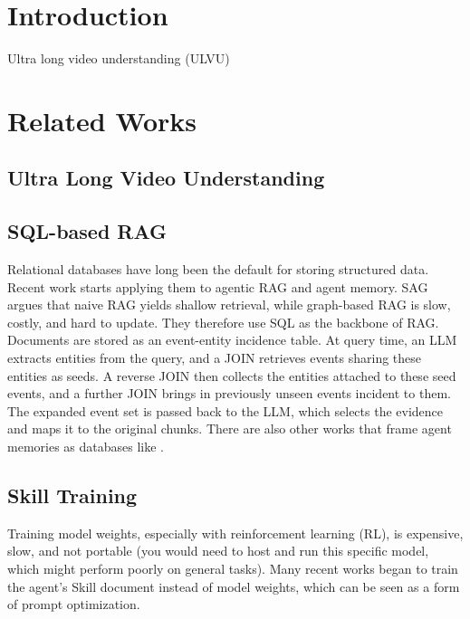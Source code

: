 \section{Introduction}
\label{sec:intro}
Ultra long video understanding (ULVU)

\section{Related Works}
\subsection{Ultra Long Video Understanding}

\subsection{SQL-based RAG}
Relational databases have long been the default for storing structured data. Recent work starts applying them to agentic RAG and agent memory. SAG \cite{wu_sag_2026} argues that naive RAG yields shallow retrieval, while graph-based RAG is slow, costly, and hard to update. They therefore use SQL as the backbone of RAG. Documents are stored as an event-entity incidence table. At query time, an LLM extracts entities from the query, and a JOIN retrieves events sharing these entities as seeds. A reverse JOIN then collects the entities attached to these seed events, and a further JOIN brings in previously unseen events incident to them. The expanded event set is passed back to the LLM, which selects the evidence and maps it to the original chunks. There are also other works that frame agent memories as databases like \cite{orogat_agent_2026}.

\subsection{Skill Training} 

Training model weights, especially with reinforcement learning (RL), is expensive, slow, and not portable (you would need to host and run this specific model, which might perform poorly on general tasks). Many recent works began to train the agent's Skill document instead of model weights, which can be seen as a form of prompt optimization.

